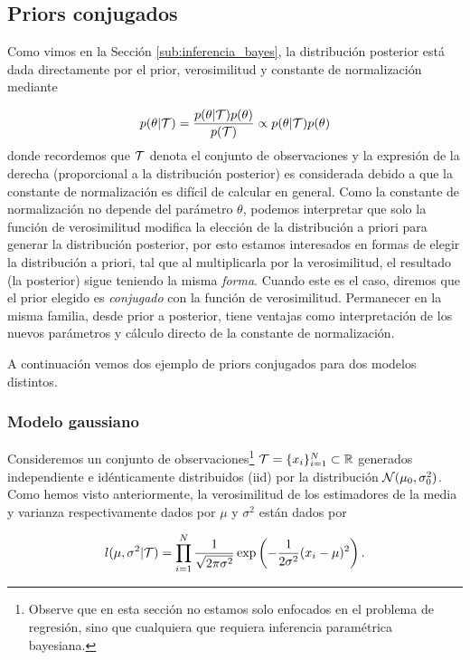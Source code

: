 \subsection{Priors conjugados}

Como vimos en la Sección \ref{sub:inferencia_bayes}, la distribución posterior está dada directamente por el prior, verosimilitud y constante de normalización mediante

\begin{equation}
	p(\theta|{\mathcal T}) = \frac{p(\theta|{\mathcal T})p(\theta)}{p({\mathcal T})}\propto p(\theta|{\mathcal T})p(\theta)
\end{equation}
donde recordemos que ${\mathcal T}$ denota el conjunto de observaciones y la expresión de la derecha (proporcional a la distribución posterior) es considerada debido a que la constante de normalización es difícil de calcular en general. Como la constante de normalización no depende del parámetro $\theta$, podemos interpretar que solo la función de verosimilitud modifica la elección de la distribución a priori para generar la distribución posterior, por esto estamos interesados en formas de elegir la distribución a priori, tal que al multiplicarla por la verosimilitud, el resultado (la posterior) sigue teniendo la misma \emph{forma}. Cuando este es el caso, diremos que el prior elegido es \emph{conjugado} con la función de verosimilitud. Permanecer en la misma familia, desde prior a posterior, tiene ventajas como interpretación de los nuevos parámetros y cálculo directo de la constante de normalización.

A continuación vemos dos ejemplo de priors conjugados para dos modelos distintos. 


\subsubsection{Modelo gaussiano}

Consideremos un conjunto de observaciones\footnote{Observe que en esta sección no estamos solo enfocados en el problema de regresión, sino que cualquiera que requiera inferencia paramétrica bayesiana.} ${\mathcal T}=\{x_i\}_{i=1}^N\subset{\mathbb R}$ generados independiente e idénticamente distribuidos (iid) por la distribución ${\mathcal N}(\mu_0,\sigma_0^2)$. Como hemos visto anteriormente, la verosimilitud de los estimadores de la media y varianza respectivamente dados por $\mu$ y $\sigma^2$ están dados por 

\begin{equation}
	l(\mu, \sigma^2 | {\mathcal T}) = \prod_{i=1}^N \frac{1}{\sqrt{2\pi\sigma^2}}\exp\left(-\frac{1}{2\sigma^2}(x_i-\mu)^2\right).
 \end{equation}

